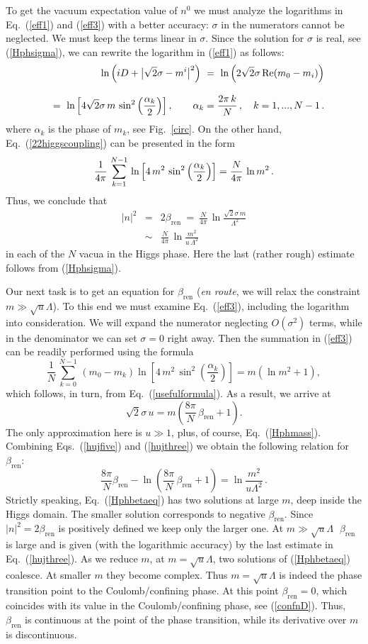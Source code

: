 \documentclass[epsfig,12pt]{article}
\def\beq{\begin{equation}}
\def\eeq{\end{equation}}
\def\beqn{\begin{eqnarray}}
\def\eeqn{\end{eqnarray}}
\def\beqn{\begin{eqnarray}}
\def\eeqn{\end{eqnarray}}
\def\beq{\begin{equation}}
\def\eeq{\end{equation}}
\newcommand{\bren}{{\beta_\text{ren}}}
\begin{document}
{To get the vacuum expectation value of $n^{0}$ we must analyze the logarithms in Eq.~(\ref{eff1}) and (\ref{eff3})
with a better accuracy: $\sigma$ in the numerators cannot be neglected. We must keep the terms linear in $\sigma$.
Since the solution for $\sigma$ is real, see (\ref{Hphsigma}), 
we can rewrite the logarithm in (\ref{eff1}) as follows:
\beqn
&&
{\rm ln}\left( i D + \bigl| \sqrt{2}\sigma -  m^i \bigr|^2 \right)
~=~
{\rm ln}\left(2\sqrt{2} \sigma\,{\rm Re} (m_0 - m_i)\right)
\nonumber\\[3mm]
&&=~
{\rm ln}\left[4\sqrt{2} \sigma\, m\, \sin^2\left(\frac{\alpha_k}{2}\right)\right],\qquad \alpha_k =\frac{2\pi\,k}{N}\,,
\quad k= 1,..., N-1\,.
\label{hujone}
\eeqn
where $\alpha_k$ is the phase of $m_k$, see Fig.~\ref{circ}. On the other hand, Eq.~(\ref{22higgscoupling})
can be presented in the form
\beq
\frac{1}{4\pi}\, \sum_{k=1}^{N-1} \, {\rm ln}\left[4\, m^2\, \sin^2\left(\frac{\alpha_k}{2}\right)\right]
= \frac{N}{4\pi}\,\ln m^2\,.
\label{hujtwo}
\eeq
Thus, we conclude that
\beqn
|n|^2 
&=&
2\bren ~=~ \frac{N}{4\pi}\, \ln \frac{\sqrt{2}\sigma\, m}{\Lambda^2} 
\nonumber\\[3mm]
&\sim&
  \frac{N}{4\pi}\, \ln \frac{ m^2}{u\,\Lambda^2} 
\label{hujthree}
\eeqn
in each of the $N$ vacua in the Higgs phase. Here the last (rather rough) estimate follows from (\ref{Hphsigma}).

Our next task is to get an equation for $\bren$ ({\em en route}, we will relax 
the constraint $m\gg\sqrt{u}\Lambda$). To this end we must examine Eq.~(\ref{eff3}),
including the logarithm into consideration. We will expand the numerator neglecting $O(\sigma^2)$ terms,
while in the denominator we can set $\sigma =0$ right away. Then the summation in 
(\ref{eff3}) can be readily performed
using the formula
\beq
\frac{1}{N}\,\sum_{k=0}^{N-1}\, \left(m_0-m_k\right)\ln\left[4\,m^2\,\sin^2\left(\frac{\alpha_k}{2}\right)\right]
=m\left(\ln m^2+1\right),
\label{hujfour}
\eeq
which follows, in turn, from Eq.~(\ref{usefulformula}). As a result, we arrive at
\beq
\sqrt{2}\sigma\,u = m\left(\frac{8\pi}{N}\,\bren +1\right).
\label{hujfive}
\eeq
The only approximation here is $u\gg 1$, plus, of course, Eq.~(\ref{Hphmass}). Combining Eqs.~(\ref{hujfive})
and (\ref{hujthree}) we obtain the following relation for $\bren$:
\beq
\frac{8\pi}{N}\bren- \ln{\left(\frac{8\pi}{N}\,\bren+1 \right)}=\ln{\frac{m^2}{u\Lambda^2}}  \,.
\label{Hphbetaeq}
\eeq
Strictly speaking, Eq.~(\ref{Hphbetaeq}) has two solutions at large $m$, deep inside the Higgs domain. 
The smaller solution corresponds to  negative $\bren$. Since $|n|^2=2\bren$ is positively defined we keep only
 the larger one. At $m \gg\sqrt{u}\Lambda\;$ $\bren$ is large and is given 
(with the logarithmic accuracy) by the last estimate
in Eq.~(\ref{hujthree}).
As we reduce $m$, at $m = \sqrt{u}\Lambda$, two solutions of (\ref{Hphbetaeq}) coalesce. 
At smaller $m$ they become complex. Thus
$m = \sqrt{u}\Lambda$ is indeed the phase transition point to the Coulomb/confining phase.
At this point $\bren=0$, which coincides with its value in the Coulomb/confining phase, see
(\ref{confnD}). Thus, $\bren$ is continuous at the point of the phase transition, while its
derivative over $m$ is discontinuous.

}
\end{document}
